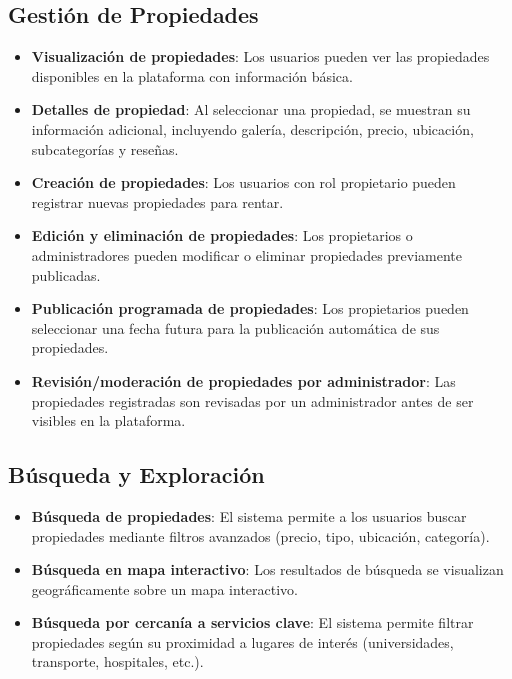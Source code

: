 	\subsection*{Gestión de Propiedades}
		\begin{itemize}
			\item \textbf{Visualización de propiedades}: Los usuarios pueden ver las propiedades disponibles en la plataforma con información básica.
			\item \textbf{Detalles de propiedad}: Al seleccionar una propiedad, se muestran su información adicional, incluyendo galería, descripción, precio, ubicación, subcategorías y reseñas.
			\item \textbf{Creación de propiedades}: Los usuarios con rol propietario pueden registrar nuevas propiedades para rentar.
			\item \textbf{Edición y eliminación de propiedades}: Los propietarios o administradores pueden modificar o eliminar propiedades previamente publicadas.
			\item \textbf{Publicación programada de propiedades}: Los propietarios pueden seleccionar una fecha futura para la publicación automática de sus propiedades.
			\item \textbf{Revisión/moderación de propiedades por administrador}: Las propiedades registradas son revisadas por un administrador antes de ser visibles en la plataforma.
		\end{itemize}
	
	\subsection*{Búsqueda y Exploración}
		\begin{itemize}
			\item \textbf{Búsqueda de propiedades}: El sistema permite a los usuarios buscar propiedades mediante filtros avanzados (precio, tipo, ubicación, categoría).
			\item \textbf{Búsqueda en mapa interactivo}: Los resultados de búsqueda se visualizan geográficamente sobre un mapa interactivo.
			\item \textbf{Búsqueda por cercanía a servicios clave}: El sistema permite filtrar propiedades según su proximidad a lugares de interés (universidades, transporte, hospitales, etc.).
		\end{itemize}
	
